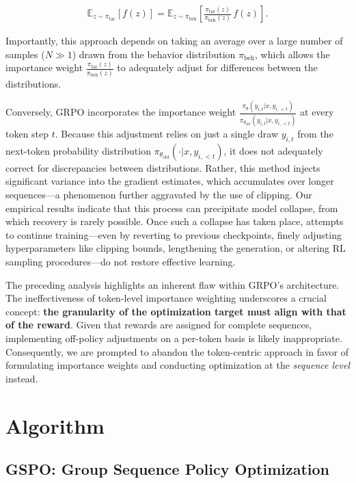 \begin{align}
\mathbb{E}_{z \sim \pi_\text{tar}} \left[ f(z) \right] = \mathbb{E}_{z \sim \pi_\text{beh}} \left[ \frac{ \pi_\text{tar} (z) }{ \pi_\text{beh} (z)} \, f(z) \right].
\end{align}

Importantly, this approach depends on taking an average over a large number of samples ($N \gg 1$) drawn from the behavior distribution $\pi_\text{beh}$, which allows the importance weight $\frac{ \pi_\text{tar} (z) }{ \pi_\text{beh} (z)}$ to adequately adjust for differences between the distributions.

Conversely, GRPO incorporates the importance weight $\frac{ \pi_{\theta} (y_{i,t} | x, y_{i,<t}) }{ \pi_{\theta_\text{old}} (y_{i,t} | x,y_{i,<t})}$ at every token step $t$. Because this adjustment relies on just a single draw $y_{i,t}$ from the next-token probability distribution $\pi_{\theta_\text{old}}( \cdot | x, y_{i, <t})$, it does not adequately correct for discrepancies between distributions. Rather, this method injects significant variance into the gradient estimates, which accumulates over longer sequences—a phenomenon further aggravated by the use of clipping. Our empirical results indicate that this process can precipitate model collapse, from which recovery is rarely possible. Once such a collapse has taken place, attempts to continue training—even by reverting to previous checkpoints, finely adjusting hyperparameters like clipping bounds, lengthening the generation, or altering RL sampling procedures—do not restore effective learning.

The preceding analysis highlights an inherent flaw within GRPO’s architecture. The ineffectiveness of token-level importance weighting underscores a crucial concept: \textbf{the granularity of the optimization target must align with that of the reward}. Given that rewards are assigned for complete sequences, implementing off-policy adjustments on a per-token basis is likely inappropriate. Consequently, we are prompted to abandon the token-centric approach in favor of formulating importance weights and conducting optimization at the \textit{sequence level} instead.

\section{Algorithm}

\subsection{GSPO: Group Sequence Policy Optimization}

